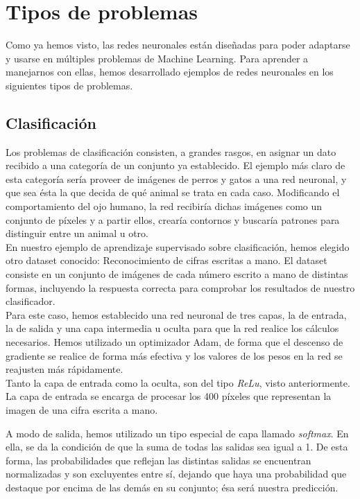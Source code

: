 \section{Tipos de problemas}
Como ya hemos visto, las redes neuronales están diseñadas para poder adaptarse y usarse en múltiples problemas de Machine Learning. Para aprender a manejarnos con ellas, hemos desarrollado ejemplos de redes neuronales en los siguientes tipos de problemas.

\subsection{Clasificación}
Los problemas de clasificación consisten, a grandes rasgos, en asignar un dato recibido a una categoría de un conjunto ya establecido. El ejemplo más claro de esta categoría sería proveer de imágenes de perros y gatos a una red neuronal, y que sea ésta la que decida de qué animal se trata en cada caso. Modificando el comportamiento del ojo humano, la red recibiría dichas imágenes como un conjunto de píxeles y a partir ellos, crearía contornos y buscaría patrones para distinguir entre un animal u otro. \\

En nuestro ejemplo de aprendizaje supervisado sobre clasificación, hemos elegido otro dataset conocido: Reconocimiento de cifras escritas a mano. El dataset consiste en un conjunto de imágenes de cada número escrito a mano de distintas formas, incluyendo la respuesta correcta para comprobar los resultados de nuestro clasificador. \\

Para este caso, hemos establecido una red neuronal de tres capas, la de entrada, la de salida y una capa intermedia u oculta para que la red realice los cálculos necesarios. Hemos utilizado un optimizador Adam, de forma que el descenso de gradiente se realice de forma más efectiva y los valores de los pesos en la red se reajusten más rápidamente. \\

Tanto la capa de entrada como la oculta, son del tipo \textit{ReLu}, visto anteriormente. La capa de entrada se encarga de procesar los 400 píxeles que representan la imagen de una cifra escrita a mano. 

A modo de salida, hemos utilizado un tipo especial de capa llamado \textit{softmax}. En ella, se da la condición de que la suma de todas las salidas sea igual a 1. De esta forma, las probabilidades que reflejan las distintas salidas se encuentran normalizadas y son excluyentes entre sí, dejando que haya una probabilidad que destaque por encima de las demás en su conjunto; ésa será nuestra predicción. 



